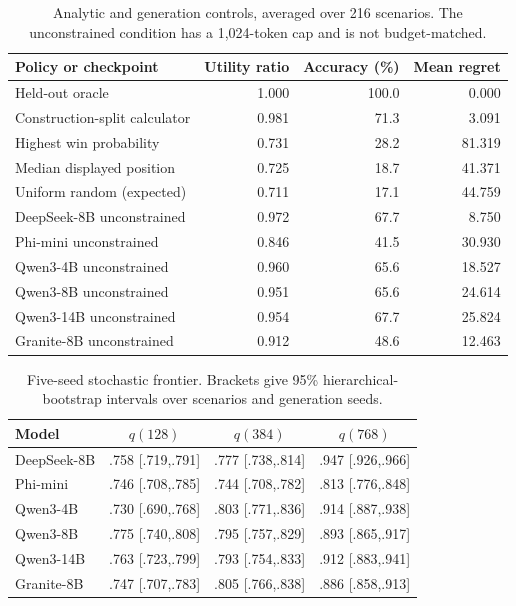 \begin{table}[H]
\centering
\caption{Analytic and generation controls, averaged over 216 scenarios. The unconstrained condition has a 1,024-token cap and is not budget-matched.}
\label{tab:baselines}
\small
\setlength{\tabcolsep}{4pt}
\begin{tabular}{lrrr}
\toprule
Policy or checkpoint & Utility ratio & Accuracy (\%) & Mean regret \\
\midrule
Held-out oracle & 1.000 & 100.0 & 0.000 \\
Construction-split calculator & 0.981 & 71.3 & 3.091 \\
Highest win probability & 0.731 & 28.2 & 81.319 \\
Median displayed position & 0.725 & 18.7 & 41.371 \\
Uniform random (expected) & 0.711 & 17.1 & 44.759 \\
\midrule
DeepSeek-8B unconstrained & 0.972 & 67.7 & 8.750 \\
Phi-mini unconstrained & 0.846 & 41.5 & 30.930 \\
Qwen3-4B unconstrained & 0.960 & 65.6 & 18.527 \\
Qwen3-8B unconstrained & 0.951 & 65.6 & 24.614 \\
Qwen3-14B unconstrained & 0.954 & 67.7 & 25.824 \\
Granite-8B unconstrained & 0.912 & 48.6 & 12.463 \\
\bottomrule
\end{tabular}
\end{table}

\begin{table}[H]
\centering
\caption{Five-seed stochastic frontier. Brackets give 95\% hierarchical-bootstrap intervals over scenarios and generation seeds.}
\label{tab:stochasticfrontier}
\scriptsize
\setlength{\tabcolsep}{3pt}
\begin{tabular}{lccc}
\toprule
Model & $q(128)$ & $q(384)$ & $q(768)$ \\
\midrule
DeepSeek-8B & .758 [.719,.791] & .777 [.738,.814] & .947 [.926,.966] \\
Phi-mini & .746 [.708,.785] & .744 [.708,.782] & .813 [.776,.848] \\
Qwen3-4B & .730 [.690,.768] & .803 [.771,.836] & .914 [.887,.938] \\
Qwen3-8B & .775 [.740,.808] & .795 [.757,.829] & .893 [.865,.917] \\
Qwen3-14B & .763 [.723,.799] & .793 [.754,.833] & .912 [.883,.941] \\
Granite-8B & .747 [.707,.783] & .805 [.766,.838] & .886 [.858,.913] \\
\bottomrule
\end{tabular}
\end{table}
